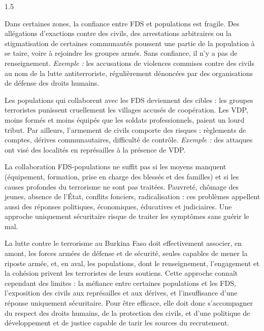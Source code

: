 \documentclass[12pt]{article}
\begin{document}
\begin{spacing}{1.5}


Dans certaines zones, la confiance entre FDS et populations est fragile. Des allégations d'exactions contre des civils, des arrestations arbitraires ou la stigmatisation de certaines communautés poussent une partie de la population à se taire, voire à rejoindre les groupes armés. Sans confiance, il n'y a pas de renseignement. \emph{Exemple :} les accusations de violences commises contre des civils au nom de la lutte antiterroriste, régulièrement dénoncées par des organisations de défense des droits humains.

Les populations qui collaborent avec les FDS deviennent des cibles : les groupes terroristes punissent cruellement les villages accusés de coopération. Les VDP, moins formés et moins équipés que les soldats professionnels, paient un lourd tribut. Par ailleurs, l'armement de civils comporte des risques : règlements de comptes, dérives communautaires, difficulté de contrôle. \emph{Exemple :} des attaques ont visé des localités en représailles à la présence de VDP.

La collaboration FDS-populations ne suffit pas si les moyens manquent (équipement, formation, prise en charge des blessés et des familles) et si les causes profondes du terrorisme ne sont pas traitées. Pauvreté, chômage des jeunes, absence de l'État, conflits fonciers, radicalisation : ces problèmes appellent aussi des réponses politiques, économiques, éducatives et judiciaires. Une approche uniquement sécuritaire risque de traiter les symptômes sans guérir le mal.


La lutte contre le terrorisme au Burkina Faso doit effectivement associer, en amont, les forces armées de défense et de sécurité, seules capables de mener la riposte armée, et, en aval, les populations, dont le renseignement, l'engagement et la cohésion privent les terroristes de leurs soutiens. Cette approche connaît cependant des limites : la méfiance entre certaines populations et les FDS, l'exposition des civils aux représailles et aux dérives, et l'insuffisance d'une réponse uniquement sécuritaire. Pour être efficace, elle doit donc s'accompagner du respect des droits humains, de la protection des civils, et d'une politique de développement et de justice capable de tarir les sources du recrutement.

\end{spacing}
\end{document}
